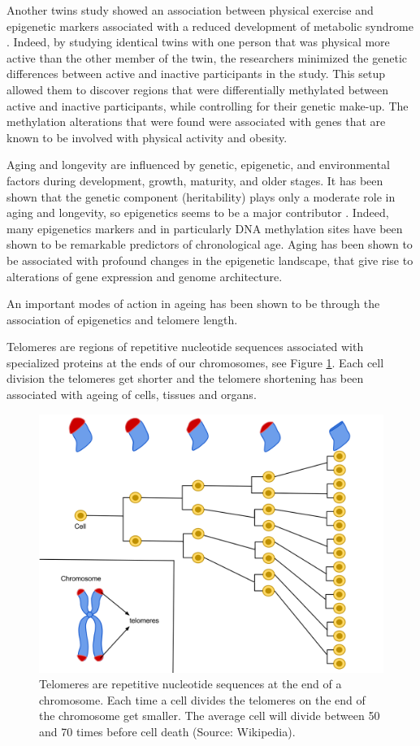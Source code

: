 \documentclass[
  11pt,
]{book}
\begin{document}
Another twins study showed an association between physical exercise and epigenetic markers associated with a reduced development of metabolic syndrome \citep{Duncan2022}. Indeed, by studying identical twins with one person that was physical more active than the other member of the twin, the researchers minimized the genetic differences between active and inactive participants in the study. This setup allowed them to discover regions that were differentially methylated between active and inactive participants, while controlling for their genetic make-up. The methylation alterations that were found were associated with genes that are known to be involved with physical activity and obesity.

Aging and longevity are influenced by genetic, epigenetic, and environmental factors during development, growth, maturity, and older stages.
It has been shown that the genetic component (heritability) plays only a moderate role in aging and longevity, so epigenetics seems to be a major contributor \citep{Adwan2018}. Indeed, many epigenetics markers and in particularly DNA methylation sites have been shown to be remarkable predictors of chronological age.
Aging has been shown to be associated
with profound changes in the epigenetic landscape, that give rise to alterations of gene expression and genome architecture.

An important modes of action in ageing has been shown to be through the association of epigenetics and telomere length.

Telomeres are regions of repetitive nucleotide sequences associated with specialized proteins at the ends of our chromosomes, see Figure \ref{fig:telomeres}. Each cell division the telomeres get shorter and the telomere shortening has been associated with ageing of cells, tissues and organs.

\begin{figure}

{\centering \includegraphics[width=0.8\linewidth]{./figs/telomeres} 

}

\caption{Telomeres are repetitive nucleotide sequences at the end of a chromosome. Each time a cell divides the telomeres on the end of the chromosome get smaller. The average cell will divide between 50 and 70 times before cell death (Source: Wikipedia).}\label{fig:telomeres}
\end{figure}
\end{document}
